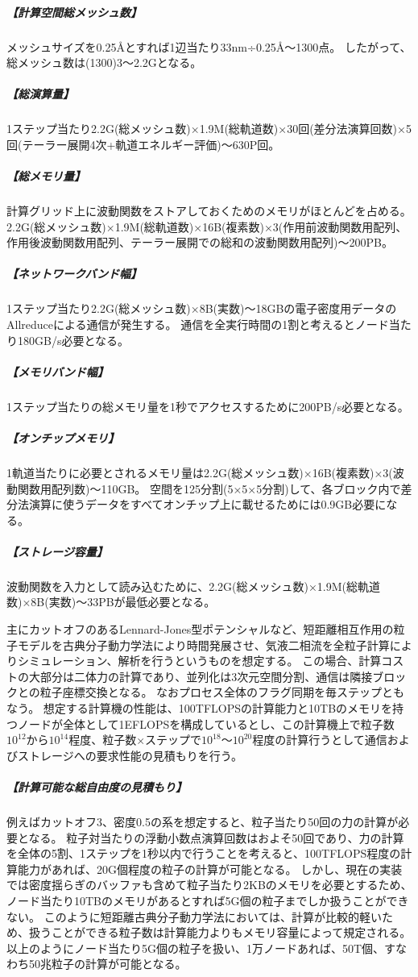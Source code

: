 \subparagraph{【計算空間総メッシュ数】}
メッシュサイズを0.25Åとすれば1辺当たり33nm÷0.25Å～1300点。
したがって、総メッシュ数は(1300)3～2.2Gとなる。

\subparagraph{【総演算量】}1ステップ当たり2.2G(総メッシュ数)×1.9M(総軌道数)×30回(差分法演算回数)×5回(テーラー展開4次+軌道エネルギー評価)～630P回。

\subparagraph{【総メモリ量】}
計算グリッド上に波動関数をストアしておくためのメモリがほとんどを占める。
2.2G(総メッシュ数)×1.9M(総軌道数)×16B(複素数)×3(作用前波動関数用配列、作用後波動関数用配列、テーラー展開での総和の波動関数用配列)～200PB。

\subparagraph{【ネットワークバンド幅】}
1ステップ当たり2.2G(総メッシュ数)×8B(実数)～18GBの電子密度用データのAllreduceによる通信が発生する。
通信を全実行時間の1割と考えるとノード当たり180GB/s必要となる。

\subparagraph{【メモリバンド幅】}
1ステップ当たりの総メモリ量を1秒でアクセスするために200PB/s必要となる。

\subparagraph{【オンチップメモリ】}
1軌道当たりに必要とされるメモリ量は2.2G(総メッシュ数)×16B(複素数)×3(波動関数用配列数)～110GB。
空間を125分割(5×5×5分割)して、各ブロック内で差分法演算に使うデータをすべてオンチップ上に載せるためには0.9GB必要になる。

\subparagraph{【ストレージ容量】}
波動関数を入力として読み込むために、2.2G(総メッシュ数)×1.9M(総軌道数)×8B(実数)～33PBが最低必要となる。


\label{sec:4-2_要求性能_短距離古典MD}
主にカットオフのあるLennard-Jones型ポテンシャルなど、短距離相互作用の粒子モデルを古典分子動力学法により時間発展させ、気液二相流を全粒子計算によりシミュレーション、解析を行うというものを想定する。
この場合、計算コストの大部分は二体力の計算であり、並列化は3次元空間分割、通信は隣接ブロックとの粒子座標交換となる。
なおプロセス全体のフラグ同期を毎ステップともなう。
想定する計算機の性能は、100TFLOPSの計算能力と10TBのメモリを持つノードが全体として1EFLOPSを構成しているとし、この計算機上で粒子数$10^{12}$から$10^{14}$程度、粒子数×ステップで$10^{18}$～$10^{20}$程度の計算行うとして通信およびストレージへの要求性能の見積もりを行う。

\subparagraph{【計算可能な総自由度の見積もり】}
例えばカットオフ3、密度0.5の系を想定すると、粒子当たり50回の力の計算が必要となる。
粒子対当たりの浮動小数点演算回数はおよそ50回であり、力の計算を全体の5割、1ステップを1秒以内で行うことを考えると、100TFLOPS程度の計算能力があれば、20G個程度の粒子の計算が可能となる。
しかし、現在の実装では密度揺らぎのバッファも含めて粒子当たり2KBのメモリを必要とするため、ノード当たり10TBのメモリがあるとすれば5G個の粒子までしか扱うことができない。
このように短距離古典分子動力学法においては、計算が比較的軽いため、扱うことができる粒子数は計算能力よりもメモリ容量によって規定される。
以上のようにノード当たり5G個の粒子を扱い、1万ノードあれば、50T個、すなわち50兆粒子の計算が可能となる。

